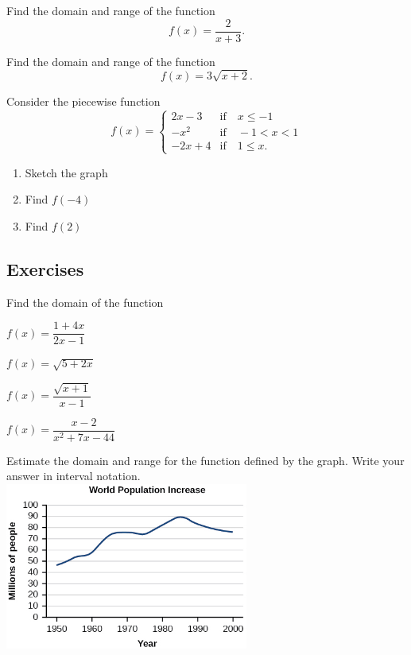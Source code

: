 \newpage

\begin{example}
  Find the domain and range of the function
  $$f(x)=\frac{2}{x+3}.$$
\end{example}

\begin{example}
  Find the domain and range of the function
  $$f(x)=3\sqrt{x+2}.$$
\end{example}


\begin{example}
  Consider the piecewise function
  $$
  f(x)=\begin{cases}
    2x-3 & \text{if}\quad x\le -1\\
    -x^2 & \text{if}\quad -1<x< 1\\
    -2x+4 & \text{if}\quad 1\le x.
  \end{cases}
  $$
  \begin{enumerate}[threecol]
    \item Sketch the graph
    \item Find $f(-4)$
    \item Find $f(2)$
  \end{enumerate}
\end{example}

\newpage

\subsection*{Exercises}

\begin{exercise}
  Find the domain of the function\\
  \begin{enumerate*}
    \item  $f(x)=\dfrac{1+4x}{2x-1}$ 
    \item  $f(x)=\sqrt{5+2x}$
    \item  $f(x)=\dfrac{\sqrt{x+1}}{x-1}$
    \item $f(x)=\dfrac{x-2}{x^2+7x-44}$
  \end{enumerate*}
\end{exercise}

\begin{exercise}
  Estimate the domain and range for the function defined by the graph. Write your answer in interval notation.\\
  \includegraphics[width=0.6\textwidth]{figs/CNX_Precalc_Figure_01_02_010.jpg}
\end{exercise}

